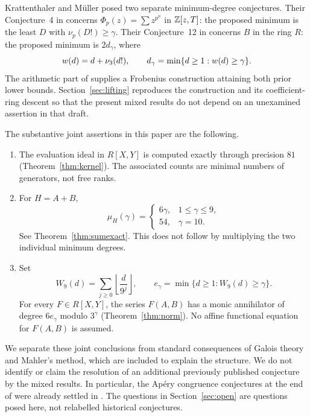 Krattenthaler and M\"uller posed two separate minimum-degree conjectures.
Their Conjecture~4 in \cite{KMp} concerns $\Phi_p(z)=\sum z^{p^n}$ in
$\mathbb Z[z,T]$: the proposed minimum is the least $D$ with $\nu_p(D!)\ge\gamma$.
Their Conjecture~12 in \cite{KM3} concerns $B$ in the ring $R$: the proposed
minimum is $2d_\gamma$, where
\begin{equation}\label{eq:w}
 w(d)=d+\nu_3(d!),\qquad d_\gamma=\min\{d\ge1:w(d)\ge\gamma\}.
\end{equation}
The arithmetic part of \cite{KEIO70} supplies a Frobenius construction
attaining both prior lower bounds. Section~\ref{sec:lifting} reproduces
the construction and its coefficient-ring descent so that the present
mixed results do not depend on an unexamined assertion in that draft.

The substantive joint assertions in this paper are the following.
\begin{enumerate}
\item The evaluation ideal in $R[X,Y]$ is computed exactly through
precision $81$ (Theorem~\ref{thm:kernel}). The associated counts are
minimal numbers of generators, not free ranks.
\item For $H=A+B$,
\begin{equation}\label{eq:mainexact}
 \mu_H(\gamma)=
 \begin{cases}6\gamma,&1\le\gamma\le9,\\54,&\gamma=10.
 \end{cases}
\end{equation}
See Theorem~\ref{thm:sumexact}. This does not follow by multiplying the
two individual minimum degrees.
\item Set
\begin{equation}\label{eq:W9}
 W_9(d)=\sum_{j\ge0}\left\lfloor\frac d{9^j}\right\rfloor,
 \qquad e_\gamma=\min\{d\ge1:W_9(d)\ge\gamma\}.
\end{equation}
For every $F\in R[X,Y]$, the series $F(A,B)$ has a monic annihilator
of degree $6e_\gamma$ modulo $3^\gamma$
(Theorem~\ref{thm:norm}). No affine functional equation for $F(A,B)$
is assumed.
\end{enumerate}

We separate these joint conclusions from standard consequences of
Galois theory and Mahler's method, which are included to explain the
structure. We do not identify or claim the resolution of an additional
previously published conjecture by the mixed results. In particular,
the Ap\'ery congruence conjectures at the end of \cite{KM3} were already
settled in \cite{Apéry}. The questions in Section~\ref{sec:open} are
questions posed here, not relabelled historical conjectures.

